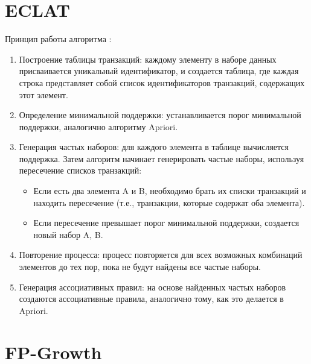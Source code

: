\documentclass[12pt]{report}
\begin{document}
\section{ECLAT}

Принцип работы алгоритма \cite{pyECLAT}:

\begin{enumerate}
    \item Построение таблицы транзакций: каждому элементу в наборе данных присваивается уникальный идентификатор, и создается таблица, где каждая строка представляет собой список идентификаторов транзакций, содержащих этот элемент.

    \item Определение минимальной поддержки: устанавливается порог минимальной поддержки, аналогично алгоритму Apriori.

    \item Генерация частых наборов: для каждого элемента в таблице вычисляется поддержка. Затем алгоритм начинает генерировать частые наборы, используя пересечение списков транзакций:
    \begin{itemize}
        \item Если есть два элемента A и B, необходимо брать их списки транзакций и находить пересечение (т.е., транзакции, которые содержат оба элемента).
        \item Если пересечение превышает порог минимальной поддержки, создается новый набор A, B.
    \end{itemize}
    \item Повторение процесса: процесс повторяется для всех возможных комбинаций элементов до тех пор, пока не будут найдены все частые наборы.
    \item Генерация ассоциативных правил: на основе найденных частых наборов создаются ассоциативные правила, аналогично тому, как это делается в Apriori.
\end{enumerate}

\section{FP-Growth}
\end{document}
